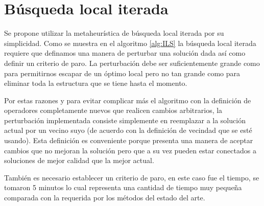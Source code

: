 \section{Búsqueda local iterada}
Se propone utilizar la metaheurística de búsqueda local iterada por su simplicidad. Como se muestra en el algoritmo \ref{alg:ILS} la búsqueda local iterada requiere que definamos una manera de perturbar una solución dada así como definir un criterio de paro. La perturbación debe ser suficientemente grande como para permitirnos escapar de un óptimo local pero no tan grande como para eliminar toda la estructura que se tiene hasta el momento.

Por estas razones y para evitar complicar más el algoritmo con la definición de operadores completamente nuevos que realicen cambios arbitrarios, la perturbación implementada consiste simplemente en reemplazar a la solución actual por un vecino suyo (de acuerdo con la definición de vecindad que se esté usando). Esta definición es conveniente porque presenta una manera de aceptar cambios que no mejoran la solución pero que a su vez pueden estar conectados a soluciones de mejor calidad que la mejor actual.

 También es necesario establecer un criterio de paro, en este caso fue el tiempo, se tomaron 5 minutos lo cual representa una cantidad de tiempo muy pequeña comparada con la requerida por los métodos del estado del arte.

